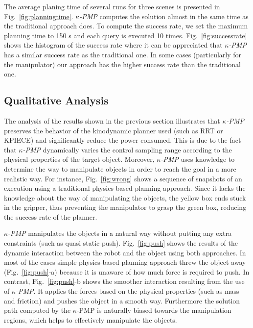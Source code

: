 \documentclass[twocolumn]{svjour3}          %
\begin{document}
The average planing time of several runs for three scenes is presented in Fig.~\ref{fig:planningtime}. \textit{$\kappa$-PMP} computes the solution almost in the same time as the traditional approach 
does. To compute the success rate, we set the maximum planning time to 150 s and each query is executed 10 times. Fig.~\ref{fig:successrate} shows the histogram of the success rate where it can be 
appreciated that  \textit{$\kappa$-PMP} has a similar success rate as the traditional one. In some cases (particularly for the manipulator) our approach has the higher success rate than the 
traditional one. 


\subsection{Qualitative Analysis}
The analysis of the results shown in the previous section illustrates that \textit{$\kappa$-PMP} preserves the behavior of the kinodynamic planner used (such as RRT or KPIECE) and significantly reduce 
the power consumed. This is due to the fact that \textit{$\kappa$-PMP} dynamically varies the control sampling range according to the physical properties of the target object. Moreover, 
\textit{$\kappa$-PMP} uses knowledge to determine the way to manipulate objects in order to reach the goal in a more realistic way. For instance, Fig.~\ref{fig:wrong} shows a sequence of snapshots of 
an execution using a traditional physics-based planning approach. Since it lacks the knowledge about the way of manipulating the objects, the yellow box ends  stuck in the gripper, thus preventing the 
manipulator to grasp the green box, reducing the success rate of the planner. 

\textit{$\kappa$-PMP} manipulates the objects in a natural way without putting any extra constraints (such as quasi static push). Fig.~\ref{fig:push} shows the results of the dynamic interaction 
between the robot and the object using both approaches. In most of the cases simple physics-based planning approach threw the object away (Fig.~\ref{fig:push}-a) because it is unaware of how much 
force is required to push. In contrast, Fig.~\ref{fig:push}-b shows the smoother interaction resulting from the use of \textit{$\kappa$-PMP}. It applies the forces based on the physical 
properties (such as mass and friction) and pushes the object in a smooth way. Furthermore the solution path computed by the 
$\kappa$-PMP 
is naturally biased towards the manipulation regions, which helps to effectively manipulate the objects.
\end{document}
